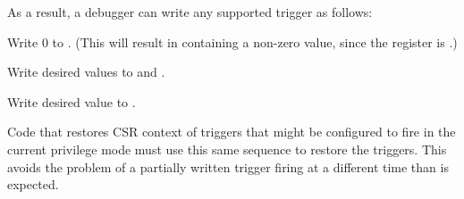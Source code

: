 \begin{steps}{As a result, a debugger can write any supported trigger as
follows:}
\item Write 0 to \RcsrTdataOne. (This will result in \RcsrTdataOne containing a
    non-zero value, since the register is \warl.)
\item Write desired values to \RcsrTdataTwo and \RcsrTdataThree.
\item Write desired value to \RcsrTdataOne.
\end{steps}

Code that restores CSR context of triggers that might be configured to fire in
the current privilege mode must use this same sequence to restore the triggers.
This avoids the problem of a partially written trigger firing at a different
time than is expected.


